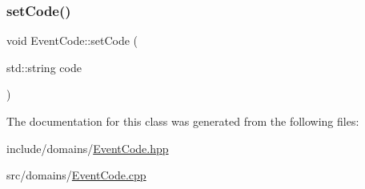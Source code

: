 \subsubsection{\texorpdfstring{setCode()}{setCode()}}
{\footnotesize\ttfamily void Event\+Code\+::set\+Code (\begin{DoxyParamCaption}\item[{std\+::string}]{code }\end{DoxyParamCaption})}



The documentation for this class was generated from the following files\+:\begin{DoxyCompactItemize}
\item 
include/domains/\mbox{\hyperlink{_event_code_8hpp}{Event\+Code.\+hpp}}\item 
src/domains/\mbox{\hyperlink{_event_code_8cpp}{Event\+Code.\+cpp}}\end{DoxyCompactItemize}
